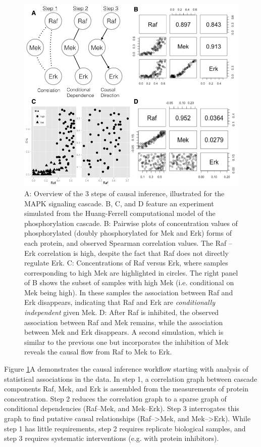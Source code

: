 \documentclass[journal=jacsat,manuscript=article]{achemso}
\begin{document}
\begin{figure}[!tpb]
\centerline{\includegraphics[width=1\textwidth]{figs/mapk.png}}
\caption{A: Overview of the 3 steps of causal inference, illustrated for the MAPK signaling cascade.    B, C, and D feature an experiment simulated from the Huang-Ferrell computational model of the phosphorylation cascade.  B: Pairwise plots of concentration values of phosphorylated (doubly phosphorylated for Mek and Erk) forms of each protein, and observed Spearman correlation values.  The Raf -- Erk correlation is high, despite the fact that Raf does not directly regulate Erk.  C: Concentrations of Raf versus Erk, where samples corresponding to high Mek are highlighted in circles.  The right panel of B shows the subset of samples with high Mek (i.e. conditional on Mek being high). In these samples the association between Raf and Erk disappears, indicating that Raf and Erk are {\it conditionally independent} given Mek.  D: After Raf is inhibited, the observed association between Raf and Mek remains, while the association between Mek and Erk disappears. A second simulation, which is similar to the previous one but incorporates the inhibition of Mek reveals the causal flow from Raf to Mek to Erk.
\label{mapkInference}}
\end{figure}


Figure \ref{mapkInference}A demonstrates the causal inference workflow starting with analysis of statistical associations in the data.  In step 1, a correlation graph between cascade components Raf, Mek, and Erk is assembled from the measurements of protein concentration.  Step 2 reduces the correlation graph to a sparse graph of conditional dependencies (Raf--Mek, and Mek--Erk).  Step 3 interrogates this graph to find putative causal relationships (Raf-->Mek, and Mek-->Erk).  While step 1 has little requirements, step 2 requires replicate biological samples, and step 3 requires systematic interventions (e.g. with protein inhibitors). 
\end{document}
